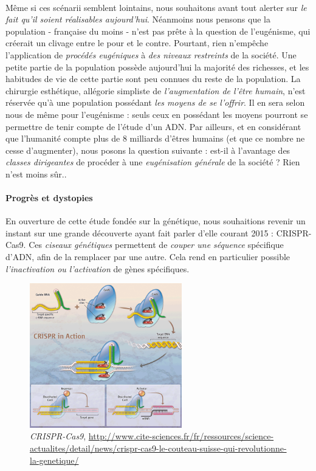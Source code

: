 \paragraph{} Même si ces scénarii semblent lointains, nous souhaitons avant tout alerter sur \emph{le fait
qu'il soient réalisables aujourd'hui}. Néanmoins nous pensons que la population - française du moins - n'est
pas prête à la question de l'eugénisme, qui créerait un clivage entre le pour et le contre. Pourtant, rien
n'empêche l'application de \emph{procédés eugéniques} à \emph{des niveaux restreints} de la société. Une
petite partie de la population possède aujourd'hui la majorité des richesses, et les habitudes de vie de
cette partie sont peu connues du reste de la population. La chirurgie esthétique, allégorie simpliste de
\emph{l'augmentation de l'être humain}, n'est réservée qu'à une population possédant \emph{les moyens de se
l'offrir}. Il en sera selon nous de même pour l'eugénisme : seuls ceux en possédant les moyens pourront se
permettre de tenir compte de l'étude d'un ADN. Par ailleurs, et en considérant que l'humanité compte plus
de 8 milliards d'êtres humains (et que ce nombre ne cesse d'augmenter), nous posons la question suivante :
est-il à l'avantage des \emph{classes dirigeantes} de procéder à une \emph{eugénisation générale} de
la société ? Rien n'est moins sûr..

\paragraph{Progrès et dystopies} En ouverture de cette étude fondée sur la génétique, nous souhaitions revenir
un instant sur une grande découverte ayant fait parler d'elle courant 2015 : CRISPR-Cas9. \cite{Genetique0} Ces
\emph{ciseaux génétiques} permettent de \emph{couper une séquence} spécifique d'ADN, afin de la remplacer par
une autre. Cela rend en particulier possible \emph{l'inactivation ou l'activation} de gènes spécifiques.

\begin{figure}[h]
    \centering
    \includegraphics[width=250px]{chapters/03/images/crispr.png}
    \caption{\label{crispr-cas9}\emph{CRISPR-Cas9}, \url{http://www.cite-sciences.fr/fr/ressources/science-actualites/detail/news/crispr-cas9-le-couteau-suisse-qui-revolutionne-la-genetique/}}
\end{figure}

